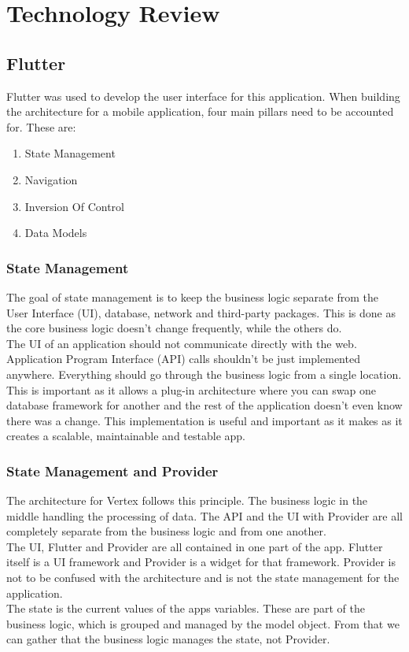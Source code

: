 \chapter{Technology Review}
\section{Flutter}
Flutter was used to develop the user interface for this application. When building the architecture for a mobile application, four main pillars need to be accounted for. These are:
\begin{enumerate}
	\item State Management
	\item Navigation
	\item Inversion Of Control
	\item Data Models
\end{enumerate}

\subsection{State Management}
The goal of state management is to keep the business logic separate from the User Interface (UI), database, network and third-party packages. This is done as the core business logic doesn't change frequently, while the others do.
\\ The UI of an application should not communicate directly with the web. Application Program Interface (API) calls shouldn't be just implemented anywhere. Everything should go through the business logic from a single location.
\\ This is important as it allows a plug-in architecture where you can swap one database framework for another and the rest of the application doesn't even know there was a change. This implementation is useful and important as it makes as it creates a scalable, maintainable and testable app.

\subsection{State Management and Provider}
The architecture for Vertex follows this principle. The business logic in the middle handling the processing of data. The API and the UI with Provider are all completely separate from the business logic and from one another.
\\ The UI, Flutter and Provider are all contained in one part of the app. Flutter itself is a UI framework and Provider is a widget for that framework. Provider is not to be confused with the architecture and is not the state management for the application.
\\ The state is the current values of the apps variables. These are part of the business logic, which is grouped and managed by the model object. From that we can gather that the business logic manages the state, not Provider.

